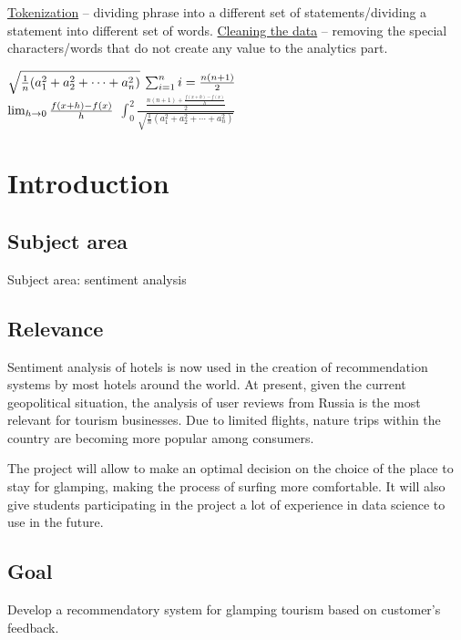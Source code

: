 \documentclass{article}
\begin{document}
\underline{Tokenization} -- dividing phrase into a different set of statements/dividing a statement into different set of words.\newline\newline
\underline{Cleaning the data} -- removing the special characters/words that do not create any value to the analytics part.


\Huge
$\newline\sqrt{\frac{1}{n}(a_{1}^2+a_{2}^2+\cdots+a_{n}^2)}\vspace{15mm} $ \newline
\LARGE
$\vspace{10mm}\sum_{i=1}^{n}i=\frac{n(n+1)}{2} \vspace{20mm}$ \\
\Huge
$\lim_{h\to 0}\frac{f(x+h)-f(x)}{h}\vspace{10mm}$
\newline
\huge
$\int_0^2\frac{\frac{n(n+1)+\frac{f(x+h)-f(x)}{h}}{2}}{\sqrt{\frac{1}{n}(a_{1}^2+a_{2}^2+\cdots+a_{n}^2)}}$


\normalsize
\newpage
\section{Introduction}
\subsection{Subject area}
\setcounter{section}{4}
Subject area: sentiment analysis

\subsection{Relevance}
\setcounter{section}{4}
Sentiment analysis of hotels is now used\cite{duchin2009markowitz} in the creation of recommendation systems by most hotels around the world. At present, given the current geopolitical situation, the analysis of user reviews from Russia is the most relevant for tourism businesses. Due to limited flights, nature trips within the country are becoming more popular among consumers.

The project will allow to make an optimal decision on the choice of the place to stay for glamping, making the process of surfing more comfortable. It will also give students participating in the project a lot of experience in data science to use in the future. 

\subsection{Goal}
\setcounter{section}{4}
Develop a recommendatory system for glamping tourism based on customer’s feedback.
\end{document}
